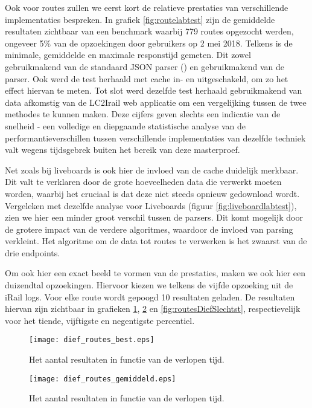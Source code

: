 Ook voor routes zullen we eerst kort de relatieve prestaties van verschillende implementaties bespreken. In grafiek \ref{fig:routelabtest} zijn de gemiddelde resultaten zichtbaar van een benchmark waarbij 779 routes opgezocht werden, ongeveer 5\% van de opzoekingen door gebruikers op 2 mei 2018. Telkens is de minimale, gemiddelde en maximale responstijd gemeten. Dit zowel gebruikmakend van de standaard JSON parser () en gebruikmakend van de  parser. Ook werd de test herhaald met cache in- en uitgeschakeld, om zo het effect hiervan te meten. Tot slot werd dezelfde test herhaald gebruikmakend van data afkomstig van de LC2Irail web applicatie om een vergelijking tussen de twee methodes te kunnen maken. Deze cijfers geven slechts een indicatie van de snelheid - een volledige en diepgaande statistische analyse van de performantieverschillen tussen verschillende implementaties van dezelfde techniek valt wegens tijdsgebrek buiten het bereik van deze masterproef.

Net zoals bij liveboards is ook hier de invloed van de cache duidelijk merkbaar. Dit valt te verklaren door de grote hoeveelheden data die verwerkt moeten worden, waarbij het cruciaal is dat deze niet steeds opnieuw gedownload wordt. Vergeleken met dezelfde analyse voor Liveboards (figuur \ref{fig:liveboardlabtest}), zien we hier een minder groot verschil tussen de parsers. Dit komt mogelijk door de grotere impact van de verdere algoritmes, waardoor de invloed van parsing verkleint. Het algoritme om de data tot routes te verwerken is het zwaarst van de drie endpoints. %

Om ook hier een exact beeld te vormen van de prestaties, maken we ook hier een duizendtal opzoekingen. Hiervoor kiezen we telkens de vijfde opzoeking uit de iRail logs. Voor elke route wordt gepoogd 10 resultaten geladen. De resultaten hiervan zijn zichtbaar in grafieken \ref{fig:routesDiefBest}, \ref{fig:routesDiefAvg} en \ref{fig:routesDiefSlechtst}, respectievelijk voor het tiende, vijftigste en negentigste percentiel.

\begin{figure}[h]
	\centering
	\texttt{[image: dief\_routes\_best.eps]}
	\caption[Aantal resultaten routes in functie van de tijd]{Het aantal resultaten in functie van de verlopen tijd.}
	\label{fig:routesDiefBest}
\end{figure}

\begin{figure}[h]
	\centering
	\texttt{[image: dief\_routes\_gemiddeld.eps]}
	\caption[Aantal resultaten routes in functie van de tijd]{Het aantal resultaten in functie van de verlopen tijd.}
	\label{fig:routesDiefAvg}
\end{figure}

